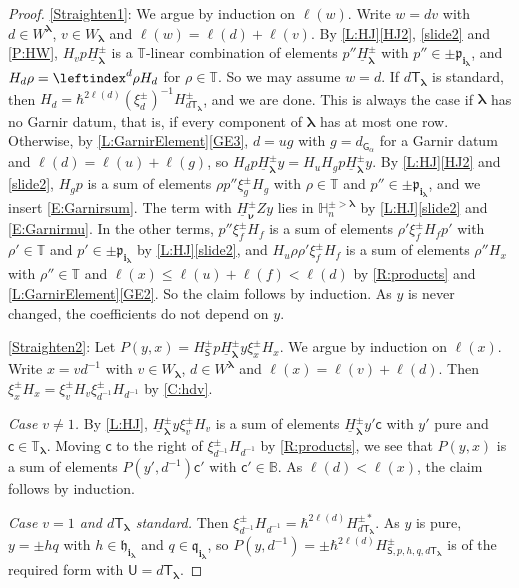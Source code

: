 \documentclass[a4paper,11pt]{amsart}
\newcommand\blam{{\boldsymbol\lambda}}
\newcommand\bnu{{\boldsymbol\nu}}
\newcommand\bi{\mathbf{i}}
\newcommand\ilam[1][\blam]{\bi_{#1}}
\numberwithin{equation}{subsection}
\theoremstyle{definition}
\theoremstyle{theorem}
\theoremstyle{remark}
\newcommand\plam[1][\lambda]{\mathfrak{p}_{#1}}
\newcommand\hlam[1][\lambda]{\mathfrak{h}_{#1}}
\newcommand\qlam[1][\lambda]{\mathfrak{q}_{#1}}
\newcommand\HH{\mathbb{H}}
\newcommand\HJpm{\underline{H}^\pm}
\newcommand\Sym{W}
\newcommand\xipm{\xi^\pm}
\newcommand\bc{\mathsf{c}}
\newcommand\bS{{\mathsf{S}}}
\newcommand\bU{{\mathsf{U}}}
\newcommand\bG{\mathsf{G}}
\newcommand\Tlam[1][\blam]{{\mathsf{T}_{#1}}}
\newcommand\Tos{\mathbb{T}}
\newcommand{\Bo}{\mathbb{B}}
\begin{document}
\begin{proof}
  \autoref{Straighten1}: We argue by induction on $\ell(w)$. Write $w=dv$ with $d\in\Sym^\blam$, $v\in\Sym_\blam$ and $\ell(w)=\ell(d)+\ell(v)$. By \autoref{L:HJ}\autoref{HJ2}, \autoref{slide2} and \autoref{P:HW}, $H_vp\HJpm_\blam$ is a $\Tos$-linear combination of elements $p''\HJpm_\blam$ with $p''\in\pm\plam[\ilam]$, and $H_d\rho=\leftindex^d{\rho}H_d$ for $\rho\in\Tos$. So we may assume $w=d$. If $d\Tlam$ is standard, then $H_d=\hbar^{2\ell(d)}(\xipm_d)^{-1}H^\pm_{d\Tlam}$, and we are done. This is always the case if $\blam$ has no Garnir datum, that is, if every component of $\blam$ has at most one row. Otherwise, by \autoref{L:GarnirElement}\autoref{GE3}, $d=ug$ with $g=d_{\bG_\alpha}$ for a Garnir datum and $\ell(d)=\ell(u)+\ell(g)$, so $H_dp\HJpm_\blam y=H_uH_gp\HJpm_\blam y$. By \autoref{L:HJ}\autoref{HJ2} and \autoref{slide2}, $H_gp$ is a sum of elements $\rho p''\xipm_gH_g$ with $\rho\in\Tos$ and $p''\in\pm\plam[\ilam]$, and we insert \autoref{E:Garnirsum}. The term with $\HJpm_\bnu Zy$ lies in $\HH^{\pm>\blam}_n$ by \autoref{L:HJ}\autoref{slide2} and \autoref{E:Garnirmu}. In the other terms, $p''\xipm_fH_f$ is a sum of elements $\rho'\xipm_fH_fp'$ with $\rho'\in\Tos$ and $p'\in\pm\plam[\ilam]$ by \autoref{L:HJ}\autoref{slide2}, and $H_u\rho\rho'\xipm_fH_f$ is a sum of elements $\rho''H_x$ with $\rho''\in\Tos$ and $\ell(x)\le\ell(u)+\ell(f)<\ell(d)$ by \autoref{R:products} and \autoref{L:GarnirElement}\autoref{GE2}. So the claim follows by induction. As $y$ is never changed, the coefficients do not depend on $y$.

  \autoref{Straighten2}: Let $P(y,x)=H^\pm_\bS p\HJpm_\blam y\xipm_xH_x$. We argue by induction on $\ell(x)$. Write $x=vd^{-1}$ with $v\in\Sym_\blam$, $d\in\Sym^\blam$ and $\ell(x)=\ell(v)+\ell(d)$. Then $\xipm_xH_x=\xipm_vH_v\xipm_{d^{-1}}H_{d^{-1}}$ by \autoref{C:hdv}.

  \emph{Case $v\ne1$.} By \autoref{L:HJ}, $\HJpm_\blam y\xipm_vH_v$ is a sum of elements $\HJpm_\blam y'\bc$ with $y'$ pure and $\bc\in\Tos_\blam$. Moving $\bc$ to the right of $\xipm_{d^{-1}}H_{d^{-1}}$ by \autoref{R:products}, we see that $P(y,x)$ is a sum of elements $P(y',d^{-1})\bc'$ with $\bc'\in\Bo$. As $\ell(d)<\ell(x)$, the claim follows by induction.

  \emph{Case $v=1$ and $d\Tlam$ standard.} Then $\xipm_{d^{-1}}H_{d^{-1}}=\hbar^{2\ell(d)}H^{\pm*}_{d\Tlam}$. As $y$ is pure, $y=\pm hq$ with $h\in\hlam[\ilam]$ and $q\in\qlam[\ilam]$, so $P(y,d^{-1})=\pm\hbar^{2\ell(d)}H^\pm_{\bS,p,h,q,d\Tlam}$ is of the required form with $\bU=d\Tlam$.


\end{proof}
\end{document}
